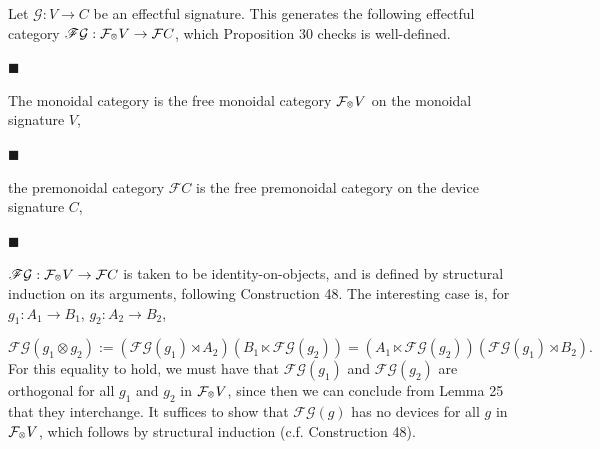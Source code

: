 \documentclass[10pt,a4paper]{article}
\begin{document}
Let $\mathcal{G}:V\to C$ be an effectful signature. This generates the following effectful category $\mathscr{F}{\mathcal{G}}:\mathcal{F}_{\mathbin{\raisebox{1.25pt}{$\scriptscriptstyle\otimes$}}}V\to\mathcal{F}C$, which Proposition 30 checks is well-defined.\par
  
\par\noindent  $\blacksquare$ 
 
The monoidal category is the free monoidal category $\mathcal{F}_{\mathbin{\raisebox{1.25pt}{$\scriptscriptstyle\otimes$}}}V$ on the monoidal signature $V$,\par
 
 
 
\par\noindent  $\blacksquare$ 
 
the premonoidal category $\mathcal{F}{C}$ is the free premonoidal category on the device signature $C$,\par
 
 
 
\par\noindent  $\blacksquare$ 
 
$\mathscr{F}{\mathcal{G}}:\mathcal{F}_{\mathbin{\raisebox{1.25pt}{$\scriptscriptstyle\otimes$}}}V\to\mathcal{F}C$ is taken to be identity-on-objects, and is defined by structural induction on its arguments, following Construction 48. The interesting case is, for $g_{1}:A_{1}\to B_{1}$, $g_{2}:A_{2}\to B_{2}$,\par
    \[\mathscr{F}{\mathcal{G}}(g_{1}\otimes g_{2}):=(\mathscr{F}{\mathcal{G}}(g_{1})\rtimes A_{2})(B_{1}\ltimes\mathscr{F}{\mathcal{G}}(g_{2}))=(A_{1}\ltimes\mathscr{F}{\mathcal{G}}(g_{2}))(\mathscr{F}{\mathcal{G}}(g_{1})\rtimes B_{2}).\]    
For this equality to hold, we must have that $\mathscr{F}{\mathcal{G}}(g_{1})$ and $\mathscr{F}{\mathcal{G}}(g_{2})$ are orthogonal for all $g_{1}$ and $g_{2}$ in $\mathcal{F}_{\mathbin{\raisebox{1.25pt}{$\scriptscriptstyle\otimes$}}}V$, since then we can conclude from Lemma 25 that they interchange. It suffices to show that $\mathscr{F}{\mathcal{G}}(g)$ has no devices for all $g$ in $\mathcal{F}_{\mathbin{\raisebox{1.25pt}{$\scriptscriptstyle\otimes$}}}V$, which follows by structural induction (c.f. Construction 48).\par
 
 
  
 
\end{document}
